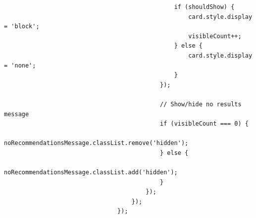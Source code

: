 \documentclass[a4paper,11pt]{article}
\begin{document}
\begin{enumerate}
\begin{tcolorbox}[colback=lightgray!6, colframe=black, left=-65mm, right=5mm, top=2mm, bottom=0mm, boxrule=0.1mm]
\begin{verbatim}
                                                if (shouldShow) {
                                                    card.style.display = 'block';
                                                    visibleCount++;
                                                } else {
                                                    card.style.display = 'none';
                                                }
                                            });

                                            // Show/hide no results message
                                            if (visibleCount === 0) {
                                                noRecommendationsMessage.classList.remove('hidden');
                                            } else {
                                                noRecommendationsMessage.classList.add('hidden');
                                            }
                                        });
                                    });
                                });
                            \end{verbatim}
                        \end{tcolorbox}
                \end{enumerate}
\end{document}
